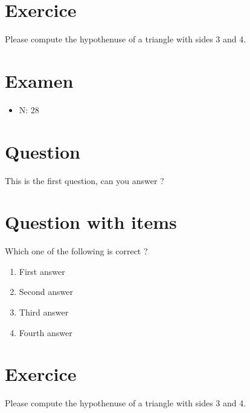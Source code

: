 \documentclass[a4paper,11pt,twoside]{article}
\begin{document}
\section*{Exercice}
\label{sec:org8575c9e}

Please compute the hypothenuse of a triangle with sides 3 and 4.



\subsection*{}
\label{sec:org9e7b99b}

\cleardoublepage

\section*{Examen}
\label{sec:org325e9d5}
\begin{itemize}
\item N: 28
\end{itemize}
\section*{Question}
\label{sec:orgd0c3f1e}

This is the first question, can you answer ?



\section*{Question with items}
\label{sec:org6e55cb0}

Which one of the following is correct ?

\begin{enumerate}
\item First answer
\item Second answer
\item Third answer
\item Fourth answer
\end{enumerate}



\section*{Exercice}
\label{sec:orgcb49125}

Please compute the hypothenuse of a triangle with sides 3 and 4.



\subsection*{}
\label{sec:orga2f4eaf}
\end{document}
